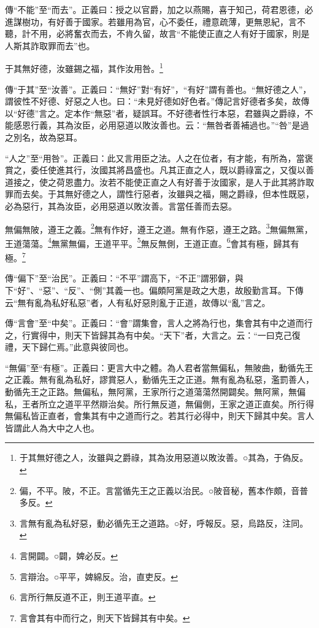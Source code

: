 {\noindent\zhuan{}\fzbyks 傳“不能”至“而去”。正義曰：授之以官爵，加之以燕賜，喜于知己，荷君恩德，必進謀樹功，有好善于國家。若雖用為官，心不委任，禮意疏薄，更無恩紀，言不聽，計不用，必將奮衣而去，不肯久留，故言“不能使正直之人有好于國家，則是人斯其詐取罪而去”也。 \par}

于其無好德，汝雖錫之福，其作汝用咎。\footnote{于其無好德之人，汝雖與之爵祿，其為汝用惡道以敗汝善。○其為，于偽反。}

{\noindent\zhuan{}\fzbyks 傳“于其”至“汝善”。正義曰：“無好”對“有好”，“有好”謂有善也。“無好德之人”，謂彼性不好德、好惡之人也。曰：“未見好德如好色者。”傳記言好德者多矣，故傳以“好德”言之。定本作“無惡”者，疑誤耳。不好德者性行本惡，君雖與之爵祿，不能感恩行義，其為汝臣，必用惡道以敗汝善也。云：“無咎者善補過也。”“咎”是過之別名，故為惡耳。 \par}

{\noindent\shu{}\fzkt “人之”至“用咎”。正義曰：此又言用臣之法。人之在位者，有才能，有所為，當褒賞之，委任使進其行，汝國其將昌盛也。凡其正直之人，既以爵祿富之，又復以善道接之，使之荷恩盡力。汝若不能使正直之人有好善于汝國家，是人于此其將詐取罪而去矣。于其無好德之人，謂性行惡者，汝雖與之福，賜之爵祿，但本性既惡，必為惡行，其為汝臣，必用惡道以敗汝善。言當任善而去惡。 \par}

無偏無陂，遵王之義。\footnote{偏，不平。陂，不正。言當循先王之正義以治民。○陂音秘，舊本作頗，音普多反。}無有作好，遵王之道。無有作惡，遵王之路。\footnote{言無有亂為私好惡，動必循先王之道路。○好，呼報反。惡，烏路反，注同。}無偏無黨，王道蕩蕩。\footnote{言開闢。○闢，婢必反。}無黨無偏，王道平平。\footnote{言辯治。○平平，婢綿反。治，直吏反。}無反無側，王道正直。\footnote{言所行無反道不正，則王道平直。}會其有極，歸其有極。\footnote{言會其有中而行之，則天下皆歸其有中矣。}


{\noindent\zhuan{}\fzbyks 傳“偏下”至“治民”。正義曰：“不平”謂高下，“不正”謂邪僻，與下“好”、“惡”、“反”、“側”其義一也。偏頗阿黨是政之大患，故殷勤言耳。下傳云“無有亂為私好私惡”者，人有私好惡則亂于正道，故傳以“亂”言之。 \par}

{\noindent\zhuan{}\fzbyks 傳“言會”至“中矣”。正義曰：“會”謂集會，言人之將為行也，集會其有中之道而行之，行實得中，則天下皆歸其為有中矣。“天下”者，大言之。云：“一曰克己復禮，天下歸仁焉。”此意與彼同也。 \par}

{\noindent\shu{}\fzkt “無偏”至“有極”。正義曰：更言大中之體。為人君者當無偏私，無陂曲，動循先王之正義。無有亂為私好，謬賞惡人，動循先王之正道。無有亂為私惡，濫罰善人，動循先王之正路。無偏私，無阿黨，王家所行之道蕩蕩然開闢矣。無阿黨，無偏私，王者所立之道平平然辯治矣。所行無反道，無偏側，王家之道正直矣。所行得無偏私皆正直者，會集其有中之道而行之。若其行必得中，則天下歸其中矣。言人皆謂此人為大中之人也。 \par}

